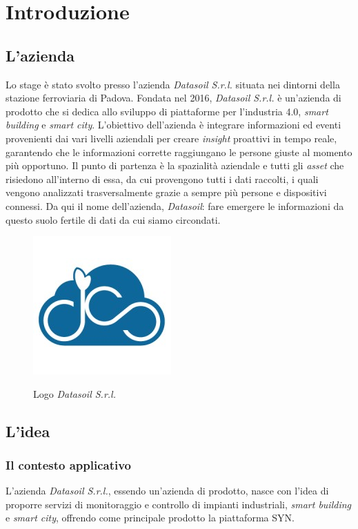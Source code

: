 \chapter{Introduzione}
\label{chap:introduzione}

\section{L'azienda}
Lo stage è stato svolto presso l'azienda \textit{Datasoil S.r.l.} situata nei dintorni della stazione ferroviaria di Padova.
Fondata nel 2016, \textit{Datasoil S.r.l.} è un'azienda di prodotto che si dedica allo sviluppo di piattaforme per l'industria 4.0,
\textit{smart building} e \textit{smart city}.
L'obiettivo dell'azienda è integrare informazioni ed eventi provenienti dai vari livelli aziendali per creare \textit{insight} proattivi
in tempo reale, garantendo che le informazioni corrette raggiungano le persone giuste al momento più opportuno.
Il punto di partenza è la spazialità aziendale e tutti gli \textit{asset} che risiedono all'interno di essa, da cui
provengono tutti i dati raccolti, i quali vengono analizzati trasversalmente grazie a sempre più persone e dispositivi connessi.
Da qui il nome dell'azienda, \textit{Datasoil}: fare emergere le informazioni da questo suolo fertile di dati da cui siamo circondati.

\begin{figure}[H]
      \centering
      \includegraphics[alt={Logo \textit{Datasoil S.r.l.}}, width=0.25\columnwidth]{img/datasoil_logo.jpg}
      \caption{Logo \textit{Datasoil S.r.l.}}
      \label{fig:datasoil}
\end{figure}

\section{L'idea}
\subsection{Il contesto applicativo}
L'azienda \textit{Datasoil S.r.l.}, essendo un'azienda di prodotto, nasce con l'idea di proporre servizi di monitoraggio e controllo
di impianti industriali, \textit{smart building} e \textit{smart city}, offrendo come principale prodotto la piattaforma SYN.

